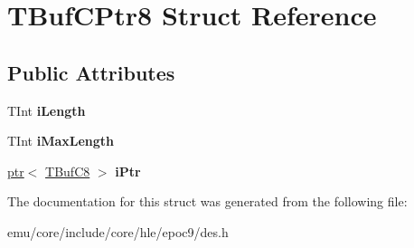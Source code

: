\hypertarget{struct_t_buf_c_ptr8}{}\section{T\+Buf\+C\+Ptr8 Struct Reference}
\label{struct_t_buf_c_ptr8}
\subsection*{Public Attributes}
\begin{DoxyCompactItemize}
\item 
\mbox{\label{struct_t_buf_c_ptr8_a894903a447c2a93879f7ebb01bdee41a}} 
T\+Int {\bfseries i\+Length}
\item 
\mbox{\label{struct_t_buf_c_ptr8_ab0c1cb23d0f3cca58e28a88259b88ad8}} 
T\+Int {\bfseries i\+Max\+Length}
\item 
\mbox{\label{struct_t_buf_c_ptr8_aa0bc4b05b368ab38d9f06dd519c2521b}} 
\mbox{\hyperlink{classeka2l1_1_1ptr}{ptr}}$<$ \mbox{\hyperlink{struct_t_buf_c8}{T\+Buf\+C8}} $>$ {\bfseries i\+Ptr}
\end{DoxyCompactItemize}


The documentation for this struct was generated from the following file\+:\begin{DoxyCompactItemize}
\item 
emu/core/include/core/hle/epoc9/des.\+h\end{DoxyCompactItemize}
